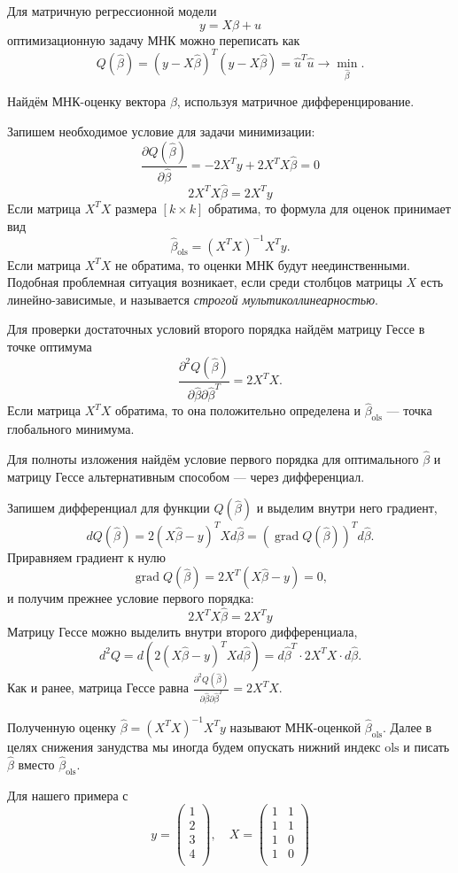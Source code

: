 \documentclass[12pt]{article}
\DeclareMathOperator{\grad}{grad}
\newcommand{\hb}{\hat{\beta}}
\newcommand{\hu}{\hat{u}}
\newcommand{\ols}{\text{ols}}
\begin{document}
Для матричную регрессионной модели
\[
y = X\beta + u
\]
оптимизационную задачу МНК можно переписать как
\[
Q(\hb) = (y-X\hb)^T(y-X\hb) = \hu^T\hu \to \underset{\hb}{\min}.
\]

Найдём МНК-оценку вектора $\beta$, используя матричное дифференцирование.

Запишем необходимое условие для задачи минимизации: 
\[
\frac{\partial Q(\hb)}{\partial \hb} = -2X^{T}y + 2X^TX\hb = 0
\]
\[
2X^TX\hb = 2X^{T}y
\]
Если матрица $X^TX$ размера $[k\times k]$ обратима, то формула для оценок принимает вид
\[
\hb_{\ols} = (X^TX)^{-1}X^Ty.
\]
Если матрица $X^TX$ не обратима, то оценки МНК будут неединственными. 
Подобная проблемная ситуация возникает, если среди столбцов матрицы $X$ есть линейно-зависимые, и называется \emph{строгой мультиколлинеарностью}.

Для проверки достаточных условий второго порядка найдём матрицу Гессе в точке оптимума
\[
\frac{\partial^2 Q(\hb)}{\partial \hb \partial \hb^T} = 2X^TX.
\]
Если матрица $X^TX$ обратима, то она положительно определена и $\hb_{\ols}$ —  точка глобального минимума. 


Для полноты изложения найдём условие первого порядка для оптимального $\hb$ и матрицу Гессе альтернативным способом — через дифференциал.

Запишем дифференциал для функции $Q(\hb)$ и выделим внутри него градиент,
\[
dQ(\hb) = 2(X\hb - y)^TX d\hb = (\grad Q(\hb))^T d\hb.
\]
Приравняем градиент к нулю
\[
\grad Q(\hb) =  2X^T(X\hb - y) = 0,
\]
и получим прежнее условие первого порядка:
\[
2X^TX\hb = 2X^{T}y
\]
Матрицу Гессе можно выделить внутри второго дифференциала,
\[
d^2 Q = d(2(X\hb - y)^TX d\hb) = d\hb^T \cdot 2X^T X \cdot d\hb. 
\]
Как и ранее, матрица Гессе равна $\frac{\partial^2 Q(\hb)}{\partial \hb \partial \hb^T} = 2X^TX$.

Полученную оценку $\hb = (X^TX)^{-1}X^Ty$ называют МНК-оценкой $\hb_{\ols}$. 
Далее в целях снижения занудства мы иногда будем опускать нижний индекс $\ols$ и писать $\hb$ вместо $\hb_{\ols}$.

Для нашего примера с 
\[
y = \begin{pmatrix}
    1 \\
    2 \\
    3 \\
    4 \\
\end{pmatrix}, \quad 
X = \begin{pmatrix}
    1 & 1 \\
    1 & 1 \\
    1 & 0 \\
    1 & 0 \\
\end{pmatrix}
\]
\end{document}
